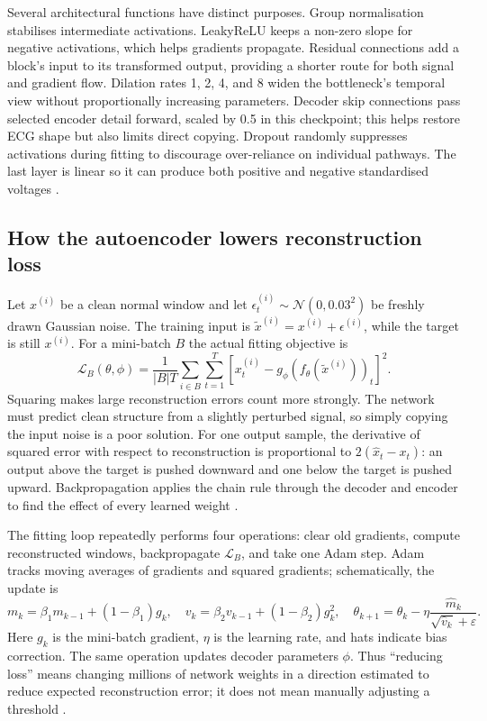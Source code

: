 Several architectural functions have distinct purposes. Group normalisation
stabilises intermediate activations. LeakyReLU keeps a non-zero slope for
negative activations, which helps gradients propagate. Residual connections
add a block's input to its transformed output, providing a shorter route for
both signal and gradient flow. Dilation rates 1, 2, 4, and 8 widen the
bottleneck's temporal view without proportionally increasing parameters.
Decoder skip connections pass selected encoder detail forward, scaled by
0.5 in this checkpoint; this helps restore ECG shape but also limits direct
copying. Dropout randomly suppresses activations during fitting to discourage
over-reliance on individual pathways. The last layer is linear so it can
produce both positive and negative standardised voltages
\cite{he2016resnet,ronneberger2015unet,srivastava2014dropout}.

\subsection{How the autoencoder lowers reconstruction loss}

Let $x^{(i)}$ be a clean normal window and let
$\epsilon^{(i)}_t\sim\mathcal{N}(0,0.03^2)$ be freshly drawn Gaussian noise.
The training input is $\widetilde x^{(i)}=x^{(i)}+\epsilon^{(i)}$, while the
target is still $x^{(i)}$. For a mini-batch $B$ the actual fitting objective is
\begin{equation}
 \mathcal{L}_{B}(\theta,\phi)=
 \frac{1}{|B|T}\sum_{i\in B}\sum_{t=1}^{T}
 \left[x^{(i)}_t-g_{\phi}(f_{\theta}(\widetilde x^{(i)}))_t\right]^2.
 \label{eq:theory-denoising-loss}
\end{equation}
Squaring makes large reconstruction errors count more strongly. The network
must predict clean structure from a slightly perturbed signal, so simply
copying the input noise is a poor solution. For one output sample, the
derivative of squared error with respect to reconstruction is proportional to
$2(\hat x_t-x_t)$: an output above the target is pushed downward and one below
the target is pushed upward. Backpropagation applies the chain rule through
the decoder and encoder to find the effect of every learned weight
\cite{vincent2008denoising}.

The fitting loop repeatedly performs four operations: clear old gradients,
compute reconstructed windows, backpropagate $\mathcal{L}_{B}$, and take one
Adam step. Adam tracks moving averages of gradients and squared gradients;
schematically, the update is
\begin{equation}
 m_k=\beta_1m_{k-1}+(1-\beta_1)g_k,\quad
 v_k=\beta_2v_{k-1}+(1-\beta_2)g_k^2,\quad
 \theta_{k+1}=\theta_k-\eta\frac{\widehat m_k}
 {\sqrt{\widehat v_k}+\varepsilon}.
 \label{eq:theory-adam}
\end{equation}
Here $g_k$ is the mini-batch gradient, $\eta$ is the learning rate, and hats
indicate bias correction. The same operation updates decoder parameters
$\phi$. Thus ``reducing loss'' means changing millions of network weights in
a direction estimated to reduce expected reconstruction error; it does not
mean manually adjusting a threshold \cite{kingma2015adam}.

